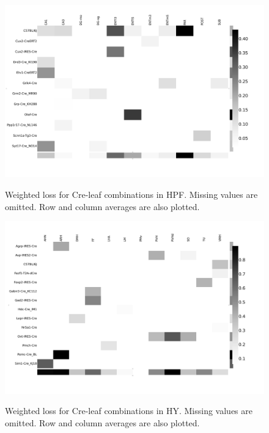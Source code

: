 
\begin{figure}[H]
    \centering
    \includegraphics[width = 7in]{figs/lossdetails_1089.png} 
    \label{fig:distances}
    \caption{Weighted loss for Cre-leaf combinations in HPF. Missing values are omitted.   Row and column averages are also plotted.}
\end{figure}

\begin{figure}[H]
    \centering
    \includegraphics[width = 7in]{figs/lossdetails_1097.png} 
    \label{fig:distances}
    \caption{Weighted loss for Cre-leaf combinations in HY. Missing values are omitted.   Row and column averages are also plotted.}
\end{figure}

